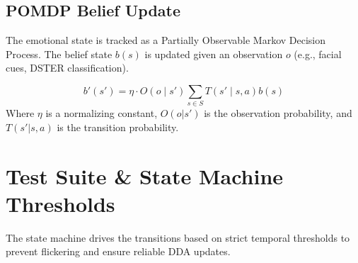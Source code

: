 \documentclass[11pt,a4paper]{article}
\begin{document}
\subsection{POMDP Belief Update}
The emotional state is tracked as a Partially Observable Markov Decision Process. The belief state $b(s)$ is updated given an observation $o$ (e.g., facial cues, DSTER classification).

\begin{equation}
    b'(s') = \eta \cdot O(o \mid s') \sum_{s \in S} T(s' \mid s, a) b(s)
\end{equation}
Where $\eta$ is a normalizing constant, $O(o|s')$ is the observation probability, and $T(s'|s,a)$ is the transition probability.

\section{Test Suite \& State Machine Thresholds}

The state machine drives the transitions based on strict temporal thresholds to prevent flickering and ensure reliable DDA updates.

\begin{table}[h!]
    \centering
    \renewcommand{\arraystretch}{1.3}
    \caption{Project ECHO Live Demo State Machine Transitions and Thresholds.}
    \label{tab:state_machine}
\end{table}
\end{document}
